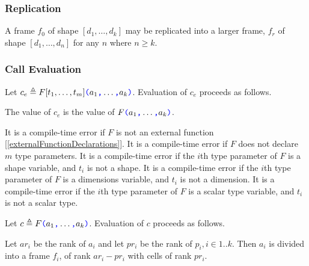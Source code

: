 \documentclass{article}
\begin{document}
\subsubsection{Replication}
\label{replication}

A frame $f_0$ of shape $[d_1, \ldots, d_k]$ may be replicated into a larger frame, $f_r$ of shape $[d_1, \ldots, d_n]$ for any $n$ where $n \ge k$. 




\subsubsection{Call Evaluation}
\label{callEvaluation}

Let $c_e \triangleq F[t_1, \ldots, t_m]\texttt{\color{blue} (}{}a_1\texttt{\color{blue} ,}{} \ldots\texttt{\color{blue} ,}{} a_k\texttt{\color{blue} )}$. Evaluation of $c_e$ proceeds as follows. 

The value of $c_e$ is the value of $F\texttt{\color{blue} (}{}a_1\texttt{\color{blue} ,}{} \ldots\texttt{\color{blue} ,}{} a_k\texttt{\color{blue} )}$.

It is a compile-time error if $F$ is not an external function [\ref{externalFunctionDeclarations}].
It is a compile-time error if $F$ does not declare $m$ type parameters. 
It is a compile-time error if the $i$th type parameter of $F$ is a shape variable, and $t_i$ is not a shape.
It is a compile-time error if the $i$th type parameter of $F$ is a dimensions variable, and $t_i$ is not a dimension.
It is a compile-time error if the $i$th type parameter of $F$ is a scalar type variable, and $t_i$ is not a scalar type.


Let $c \triangleq F\texttt{\color{blue} (}{}a_1\texttt{\color{blue} ,}{} \ldots\texttt{\color{blue} ,}{} a_k\texttt{\color{blue} )}$. Evaluation of $c$ proceeds as follows. 

Let $ar_i$ be the rank of $a_i$ and let $pr_i$ be the rank of $p_i, i \in 1.. k$. Then  $a_i$ is divided into a frame $f_i$, of rank $ar_i - pr_i$ with cells of rank $pr_i$. 
\end{document}
